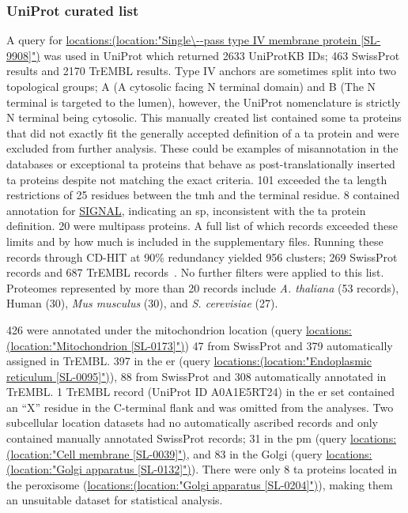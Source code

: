 \subsubsection{UniProt curated list}
A query for \url{locations:(location:"Single\--pass type IV membrane protein [SL-9908]")} was used in UniProt which returned 2633 UniProtKB IDs; 463 SwissProt results and 2170 TrEMBL results.
Type IV anchors are sometimes split into two topological groups; A (A cytosolic facing N terminal domain) and B (The N terminal is targeted to the lumen), however, the UniProt nomenclature is strictly N terminal being cytosolic.
This manually created list contained some \gls{ta} proteins that did not exactly fit the generally accepted definition of a \gls{ta} protein and were excluded from further analysis.
These could be examples of misannotation in the databases or exceptional \gls{ta} proteins that behave as post\--translationally inserted \gls{ta} proteins despite not matching the exact criteria.
101 exceeded the \gls{ta} length restrictions of 25 residues between the \gls{tmh} and the terminal residue.
8 contained annotation for \url{SIGNAL}, indicating an \gls{sp}, inconsistent with the \gls{ta} protein definition.
20 were multipass proteins.
A full list of which records exceeded these limits and by how much is included in the supplementary files.
Running these records through CD-HIT at 90\% redundancy yielded 956 clusters; 269 SwissProt records and 687 TrEMBL records~\cite{Huang2010, Wu2011}.
No further filters were applied to this list.
Proteomes represented by more than 20 records include \textit{A. thaliana} (53 records), Human (30), \textit{Mus musculus} (30), and \textit{S. cerevisiae} (27). %

426 were annotated under the mitochondrion location (query \url{locations:(location:"Mitochondrion [SL-0173]")}) 47 from SwissProt and 379 automatically assigned in TrEMBL.
397 in the \gls{er} (query \url{locations:(location:"Endoplasmic reticulum [SL-0095]")}), 88 from SwissProt and 308 automatically annotated in TrEMBL.
1 TrEMBL record (UniProt ID A0A1E5RT24) in the \gls{er} set contained an ``X'' residue in the C\--terminal flank and was omitted from the analyses.
Two subcellular location datasets had no automatically ascribed records and only contained manually annotated SwissProt records; 31 in the \gls{pm} (query \url{locations:(location:"Cell membrane [SL-0039]")}, and 83 in the Golgi (query \url{locations:(location:"Golgi apparatus [SL-0132]")}).
There were only 8 \gls{ta} proteins located in the peroxisome (\url{locations:(location:"Golgi apparatus [SL-0204]")}), making them an unsuitable dataset for statistical analysis.

